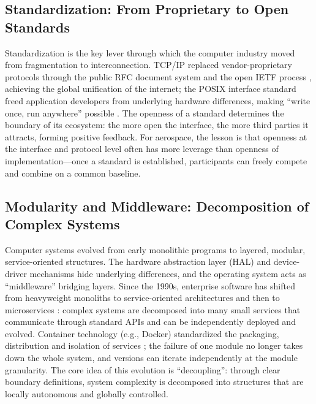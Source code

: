 \documentclass[11pt]{article}
\begin{document}
\subsection{Standardization: From Proprietary to Open Standards}
Standardization is the key lever through which the computer industry moved from fragmentation to interconnection. TCP/IP replaced vendor-proprietary protocols through the public RFC document system and the open IETF process \cite{rfc2026}, achieving the global unification of the internet; the POSIX interface standard freed application developers from underlying hardware differences, making ``write once, run anywhere'' possible \cite{posix2017}. The openness of a standard determines the boundary of its ecosystem: the more open the interface, the more third parties it attracts, forming positive feedback. For aerospace, the lesson is that openness at the interface and protocol level often has more leverage than openness of implementation---once a standard is established, participants can freely compete and combine on a common baseline.

\subsection{Modularity and Middleware: Decomposition of Complex Systems}
Computer systems evolved from early monolithic programs to layered, modular, service-oriented structures. The hardware abstraction layer (HAL) and device-driver mechanisms hide underlying differences, and the operating system acts as ``middleware'' bridging layers. Since the 1990s, enterprise software has shifted from heavyweight monoliths to service-oriented architectures and then to microservices \cite{newman2015}: complex systems are decomposed into many small services that communicate through standard APIs and can be independently deployed and evolved. Container technology (e.g., Docker) standardized the packaging, distribution and isolation of services \cite{docker2014}; the failure of one module no longer takes down the whole system, and versions can iterate independently at the module granularity. The core idea of this evolution is ``decoupling'': through clear boundary definitions, system complexity is decomposed into structures that are locally autonomous and globally controlled.
\end{document}
